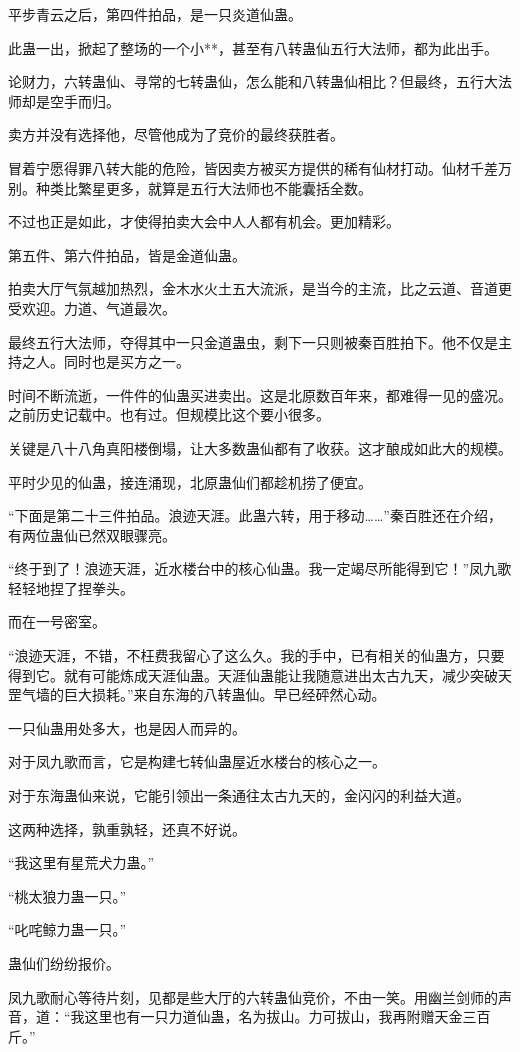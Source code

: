 \begin{this_body}
平步青云之后，第四件拍品，是一只炎道仙蛊。

此蛊一出，掀起了整场的一个小**，甚至有八转蛊仙五行大法师，都为此出手。

论财力，六转蛊仙、寻常的七转蛊仙，怎么能和八转蛊仙相比？但最终，五行大法师却是空手而归。

卖方并没有选择他，尽管他成为了竞价的最终获胜者。

冒着宁愿得罪八转大能的危险，皆因卖方被买方提供的稀有仙材打动。仙材千差万别。种类比繁星更多，就算是五行大法师也不能囊括全数。

不过也正是如此，才使得拍卖大会中人人都有机会。更加精彩。

第五件、第六件拍品，皆是金道仙蛊。

拍卖大厅气氛越加热烈，金木水火土五大流派，是当今的主流，比之云道、音道更受欢迎。力道、气道最次。

最终五行大法师，夺得其中一只金道蛊虫，剩下一只则被秦百胜拍下。他不仅是主持之人。同时也是买方之一。

时间不断流逝，一件件的仙蛊买进卖出。这是北原数百年来，都难得一见的盛况。之前历史记载中。也有过。但规模比这个要小很多。

关键是八十八角真阳楼倒塌，让大多数蛊仙都有了收获。这才酿成如此大的规模。

平时少见的仙蛊，接连涌现，北原蛊仙们都趁机捞了便宜。

“下面是第二十三件拍品。浪迹天涯。此蛊六转，用于移动……”秦百胜还在介绍，有两位蛊仙已然双眼骤亮。

“终于到了！浪迹天涯，近水楼台中的核心仙蛊。我一定竭尽所能得到它！”凤九歌轻轻地捏了捏拳头。

而在一号密室。

“浪迹天涯，不错，不枉费我留心了这么久。我的手中，已有相关的仙蛊方，只要得到它。就有可能炼成天涯仙蛊。天涯仙蛊能让我随意进出太古九天，减少突破天罡气墙的巨大损耗。”来自东海的八转蛊仙。早已经砰然心动。

一只仙蛊用处多大，也是因人而异的。

对于凤九歌而言，它是构建七转仙蛊屋近水楼台的核心之一。

对于东海蛊仙来说，它能引领出一条通往太古九天的，金闪闪的利益大道。

这两种选择，孰重孰轻，还真不好说。

“我这里有星荒犬力蛊。”

“桃太狼力蛊一只。”

“叱咤鲸力蛊一只。”

蛊仙们纷纷报价。

凤九歌耐心等待片刻，见都是些大厅的六转蛊仙竞价，不由一笑。用幽兰剑师的声音，道：“我这里也有一只力道仙蛊，名为拔山。力可拔山，我再附赠天金三百斤。”


\end{this_body}
